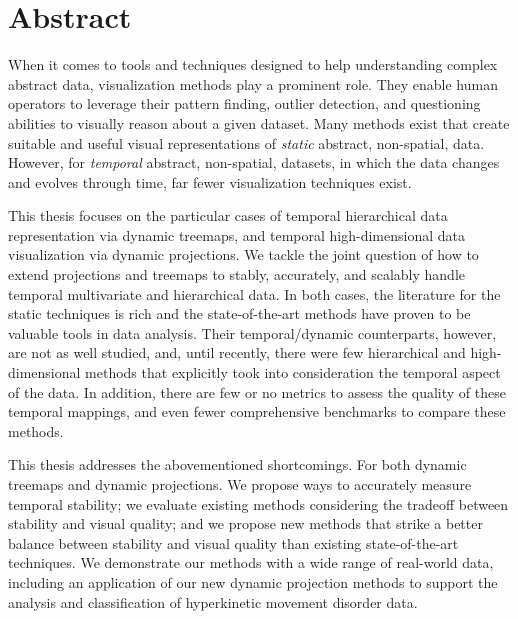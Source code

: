 \begingroup

\let\clearpage\relax
\let\cleardoublepage\relax
\let\cleardoublepage\relax

\manualmark
{} 

\chapter*{Abstract}

When it comes to tools and techniques designed to help understanding complex abstract data, visualization methods play a prominent role. They enable human operators to leverage their pattern finding, outlier detection, and questioning abilities to visually reason about a given dataset. Many methods exist that create suitable and useful visual representations of \emph{static} abstract, non-spatial, data. However, for \emph{temporal} abstract, non-spatial, datasets, in which the data changes and evolves through time, far fewer visualization techniques exist.

This thesis focuses on the particular cases of temporal hierarchical data representation via dynamic treemaps, and temporal high-dimensional data visualization via dynamic projections. We tackle the joint question of how to extend projections and treemaps to stably, accurately, and scalably handle temporal multivariate and hierarchical data. In both cases, the literature for the static techniques is rich and the state-of-the-art methods have proven to be valuable tools in data analysis. Their temporal/dynamic counterparts, however, are not as well studied, and, until recently, there were few hierarchical and high-dimensional methods that explicitly took into consideration the temporal aspect of the data. In addition, there are few or no metrics to assess the quality of these temporal mappings, and even fewer comprehensive benchmarks to compare these methods. 

This thesis addresses the abovementioned shortcomings. For both dynamic treemaps and dynamic projections. We propose ways to accurately measure temporal stability; we evaluate existing methods considering the tradeoff between stability and visual quality; and we propose new methods that strike a better balance between stability and visual quality than existing state-of-the-art techniques. We demonstrate our methods with a wide range of real-world data, including an application of our new dynamic projection methods to support the analysis and classification of hyperkinetic movement disorder data.

